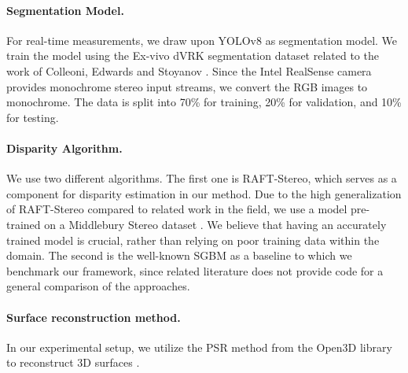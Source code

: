 \documentclass[letterpaper]{article} %
\begin{document}
\paragraph{Segmentation Model.} For real-time measurements, we draw upon YOLOv8 \cite{jocher_yolov8_2023} as segmentation model. We train the model using the Ex-vivo dVRK segmentation dataset related to the work of Colleoni, Edwards and Stoyanov . Since the Intel RealSense camera provides monochrome stereo input streams, we convert the RGB images to monochrome. The data is split into 70\% for training, 20\% for validation, and 10\% for testing.

\paragraph{Disparity Algorithm.} We use two different algorithms. The first one is RAFT-Stereo, which serves as a component for disparity estimation in our method. Due to the high generalization of RAFT-Stereo compared to related work in the field, we use a model pre-trained on a Middlebury Stereo dataset \cite{lipson_raft-stereo_2021}. We believe that having an accurately trained model is crucial, rather than relying on poor training data within the domain. The second is the well-known SGBM \cite{hirschmuller_accurate_2005} as a baseline to which we benchmark our framework, since related literature does not provide code for a general comparison of the approaches.


\paragraph{Surface reconstruction method.} In our experimental setup, we utilize the PSR method from the Open3D library to reconstruct 3D surfaces \cite{zhou_open3d_2018}.

        
\end{document}
